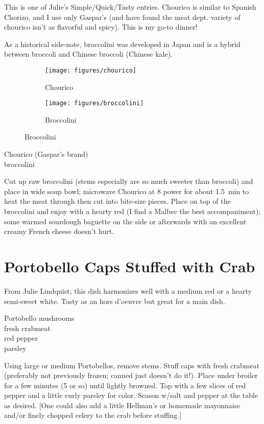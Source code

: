 \begin{open}
    This is one of Julie's Simple/Quick/Tasty entries.  Chourico is similar to
    Spanish Chorizo, and I use only Gaspar’s (and have found the meat dept.
    variety of chourico isn’t as flavorful and spicy). This is my go-to dinner!

    As a historical side-note, broccolini was developed in Japan and is a hybrid
    between broccoli and Chinese broccoli (Chinese kale).
\end{open}
\begin{figure}[h]
\centering
    \begin{subfigure}[c]{0.25\textwidth}
        \texttt{[image: figures/chourico]}
        \caption{Chourico}
    \end{subfigure}
    \begin{subfigure}[c]{0.25\textwidth}
        \texttt{[image: figures/broccolini]}
        \caption{Broccolini}
    \end{subfigure}
\end{figure}
\begin{ingredients}
    Chourico (Gaspar's brand)\\
    broccolini\\
\end{ingredients}
Cut up raw broccolini (stems especially are so much sweeter than broccoli) and
place in wide soup bowl; microwave Chourico at 8 power for about
\SI{1.5}{\minute} to heat the meat through then cut into bite-size pieces.
Place on top of the broccolini and enjoy with a hearty red (I find a Malbec the
best accompaniment); some warmed sourdough baguette on the side or afterwards
with an excellent creamy French cheese doesn’t hurt.

\section{Portobello Caps Stuffed with Crab}

\begin{open}
    From Julie Lindquist; this dish harmonizes well with a medium red or a hearty semi-sweet white. Tasty as an hors d'oeuvre but great for a main dish.
\end{open}
\begin{ingredients}
    Portobello mushrooms\\
    fresh crabmeat\\
    red pepper\\
    parsley\\
\end{ingredients}
Using large or medium Portobellos, remove stems. Stuff caps with fresh crabmeat (preferably not previously frozen; canned just doesn't do it!). Place under broiler for a few minutes (5 or so) until lightly browned. Top with a few slices of red pepper and a little curly parsley for color. Season w/salt and pepper at the table as desired.  [One could also add a little Hellman’s or homemade mayonnaise and/or finely chopped celery to the crab before stuffing.]

